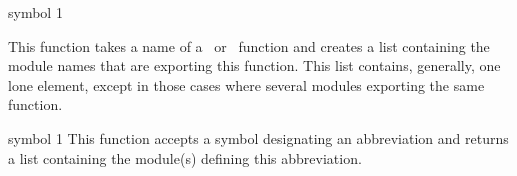  {symbol} {1}

This function takes a name of a \LeLisp\ or \Aida\ function and creates a list containing the module names that are exporting this function.  This list contains, generally, one lone element, except in those cases where several modules exporting the same function.

 {symbol} {1}
This function accepts a symbol designating an abbreviation and returns a list containing the module(s) defining this abbreviation.
